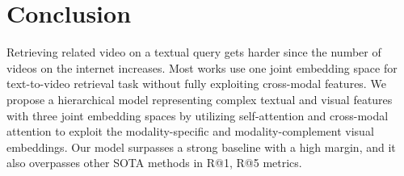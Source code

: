 \documentclass{article}
\begin{document}
\section{Conclusion}
\label{sec:foot}

Retrieving related video on a textual query gets harder since the number of videos on the internet increases. Most works use one joint embedding space for text-to-video retrieval task without fully exploiting cross-modal features. We propose a hierarchical model representing complex textual and visual features with three joint embedding spaces by utilizing self-attention and cross-modal attention to exploit the modality-specific and modality-complement visual embeddings. Our model surpasses a strong baseline with a high margin, and it also overpasses other SOTA methods in R@1, R@5 metrics.

\clearpage
\newpage


\end{document}
